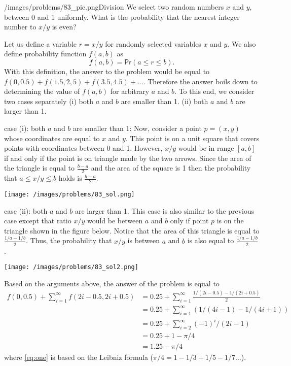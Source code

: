 \begin{problem}{/images/problems/83_pic.png}{Division} We select two random numbers $x$ and $y$, between 0 and 1 uniformly. What is the probability that the nearest integer number to $x/y$ is even?
\end{problem}

\begin{solution}
Let us define a variable $r = x/y$ for randomly selected variables $x$ and $y$. We also define probability function $f(a,b)$ as 
$$f(a,b) = \mathsf{Pr}(a \leq r \leq b).$$
With this definition, the answer to the problem would be equal to $f(0,0.5) + f(1.5, 2,5) + f(3.5,4.5) + \ldots$. Therefore the answer boils down to determining the value of $f(a,b)$ for arbitrary $a$ and $b$. To this end, we consider two cases separately (i) both $a$ and $b$ are smaller than 1. (ii) both $a$ and $b$ are larger than 1.

case (i): both $a$ and $b$ are smaller than 1: Now, consider a point $p = (x,y)$ whose coordinates are equal to $x$ and $y$. This point is on a unit square that covers points with coordinates between 0 and 1. However, $x/y$ would be in range $[a,b]$ if and only if the point is on triangle made by the two arrows. Since the area of the triangle is equal to $\frac{b-a}{2}$ and the area of the square is 1 then the probability that $a \leq x/y \leq b$ holds is $\frac{b-a}{2}$.

\begin{center}
\texttt{[image: /images/problems/83\_sol.png]}
\end{center}
case (ii): both $a$ and $b$ are larger than 1. This case is also similar to the previous case except that ratio $x/y$ would be between $a$ and $b$ only if point $p$ is on the triangle shown in the figure below. Notice that the area of this triangle is equal to $\frac{1/a - 1/b}{2}$. Thus, the probability that $x/y$ is between $a$ and $b$ is also equal to $\frac{1/a - 1/b}{2}$.
\begin{center}
\texttt{[image: /images/problems/83\_sol2.png]}
\end{center}
Based on the arguments above, the answer of the problem is equal to 
\begin{align}
f(0,0.5) + \sum_{i=1}^{\infty} f(2i-0.5, 2i+0.5)  &= 0.25 + \sum_{i=1}^{\infty}  \frac{1/(2i-0.5) - 1/(2i+0.5)}{2} \nonumber  \\
& = 0.25 + \sum_{i=1}^{\infty}  (1/(4i-1) - 1/(4i+1)) \nonumber \\
& = 0.25 + \sum_{i=2}^{\infty}  (-1)^i/(2i-1) \nonumber  \\
& = 0.25 + 1-\pi/4 \label{eq:one}\\
& = 1.25-\pi/4 \nonumber
\end{align}
where \eqref{eq:one} is based on the Leibniz formula ($\pi/4 = 1-1/3 + 1/5 - 1/7 \ldots$).
\end{solution}

